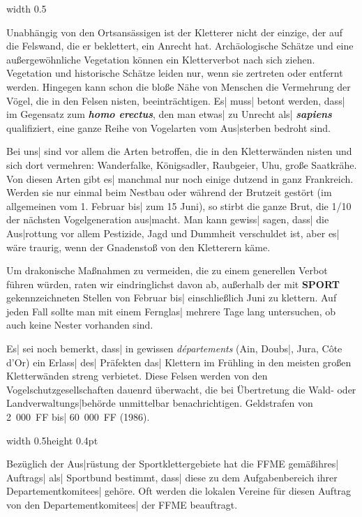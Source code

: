 \documentclass[12pt]{article}
\def\Ital#1{{\bfseries\slshape #1\/}}
\def\3{\ss}
\def\medrule{\par\medskip\centerline{\vrule width 0.5\hsize}\par\medskip}
\def\ecole{{\sf\bfseries SPORT{}}}
\def\FFME{{\SetCmDefault\rm FFME{}}}
\begin{document}
 \medrule

 Unabh\"angig von den Ortsans\"assigen ist der Kletterer nicht der einzige,
der auf die Felswand, die er beklettert, ein Anrecht hat. Arch\"aologische
Sch\"atze und eine au\3ergew\"ohnliche Vegetation k\"onnen ein Kletterverbot
nach sich ziehen. Vegetation und historische Sch\"atze leiden nur, wenn sie
zertreten oder entfernt werden. Hingegen kann schon die blo\3e N\"ahe von
Menschen die Vermehrung der V\"ogel, die in den Felsen nisten,
beeintr\"achtigen. Es| mus{}s| betont werden, das{}s| im Gegensatz zum \Ital{homo
erectus}, den man etwas| zu Unrecht als| \Ital{sapiens} qualifiziert, eine ganze
Reihe von Vogelarten vom Aus|sterben bedroht sind.

 Bei uns| sind vor allem die Arten betroffen, die in den Kletterw\"anden nisten
und sich dort vermehren: Wanderfalke, K\"onigsadler, Raubgeier, Uhu, gro\3e
Saatkr\"ahe. Von diesen Arten gibt es| manchmal nur noch einige dutzend in ganz
Frankreich. Werden sie nur einmal beim Nestbau oder w\"ahrend der Brutzeit
gest\"ort (im allgemeinen vom 1. Februar bis| zum 15 Juni), so stirbt die ganze
Brut, die 1/10 der n\"achsten Vogelgeneration aus|macht. Man kann gewis{}s| sagen,
das{}s| die Aus|rottung vor allem Pestizide, Jagd und Dummheit verschuldet ist,
aber es| w\"are traurig, wenn der Gnadensto\3{ }von den Kletterern k\"ame.

 Um drakonische Ma\3nahmen zu vermeiden, die zu einem generellen
Verbot f\"uhren w\"urden, raten wir eindringlichst davon ab, au\3er\-halb
der mit {\ecole} gekennzeichneten Stellen von Februar bis|
einschlie\3lich Juni zu klettern. Auf jeden Fall sollte man mit einem
Fernglas| mehrere Tage lang untersuchen, ob auch keine Nester
vorhanden sind.

 Es| sei noch bemerkt, das{}s| in gewissen {\slshape d\'epartements} (Ain,
Doubs|, Jura, C\^ote d'Or) ein Erlas{}s| des| Pr\"afekten das| Klettern im
Fr\"uhling in den meisten gro\3en Kletterw\"anden streng verbietet. Diese
Felsen werden von den Vogel\-schutz\-gesell\-schaften dauenrd \"uber\-wacht,
die bei \"Uber\-tretung die Wald- oder Land\-ver\-waltungs|\-beh\"orde
unmit\-tel\-bar benach\-richtigen.
Geldstrafen von 2~000~{\SetCmDefault\rm FF} bis|  60~000~{\SetCmDefault\rm FF} (1986).

 \medskip\centerline{\vrule width 0.5\hsize height 0.4pt}

 \medskip
 Bez\"uglich der Aus|r\"ustung der Sport\-kletter\-gebiete hat die \FFME{}
gem\"a\3ihres| Auftrags| als| Sportbund bestimmt, das{}s| diese zu dem
Aufgaben\-bereich ihrer Departement\-komitees| geh\"ore. Oft werden die lokalen
Vereine f\"ur diesen Auftrag von den Departement\-komitees| der \FFME{}
beauftragt.
\end{document}
